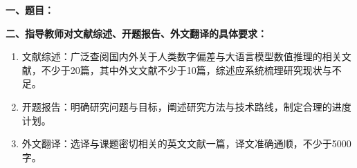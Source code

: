 {
    \setlength{\parindent}{0em}
    \par {\bfseries 一、题目：\Title}
    \\
    \par {\bfseries 二、指导教师对文献综述、开题报告、外文翻译的具体要求：}
}

\begin{enumerate}
    \item 文献综述：广泛查阅国内外关于人类数字偏差与大语言模型数值推理的相关文献，不少于20篇，其中外文文献不少于10篇，综述应系统梳理研究现状与不足。
    \item 开题报告：明确研究问题与目标，阐述研究方法与技术路线，制定合理的进度计划。
    \item 外文翻译：选译与课题密切相关的英文文献一篇，译文准确通顺，不少于5000字。
\end{enumerate}

\signature{指导教师（签名）}
